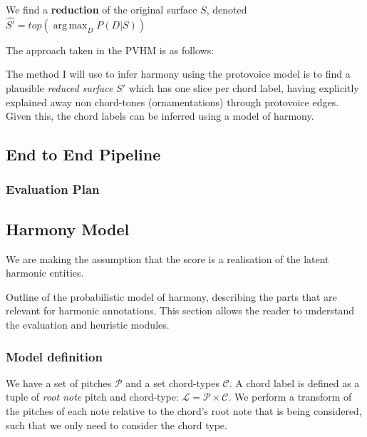 \documentclass[12pt,a4paper,twoside,openright]{report}
\DeclareMathOperator*{\argmax}{arg\,max}
\theoremstyle{definition}
\begin{document}
We find a \textbf{reduction} of the original surface $S$, denoted $\hat{S'} = top(\argmax_D P(D|S))$

The approach taken in the PVHM is as follows:



The method I will use to infer harmony using the protovoice model is to find a plausible \textit{reduced surface} $S'$ which has one slice per chord label, having explicitly explained away non chord-tones (ornamentations) through protovoice edges. 
Given this, the chord labels can be inferred using a model of harmony.

\subsection{End to End Pipeline}
\subsubsection{Evaluation Plan}

\subsection{Harmony Model}
We are making the assumption that the score is a realisation of the latent harmonic entities. 

Outline of the probabilistic model of harmony, describing the parts that are relevant for harmonic annotations. This section allows the reader to understand the evaluation and heuristic modules.

\subsubsection{Model definition}
We have a set of pitches $\mathcal{P}$ and a set chord-types $\mathcal{C}$. A chord label is defined as a tuple of \textit{root note} pitch and chord-type: $\mathcal{L} = \mathcal{P} \times \mathcal{C}$. We perform a transform of the pitches of each note relative to the chord's root note that is being considered, such that we only need to consider the chord type. 
\end{document}
